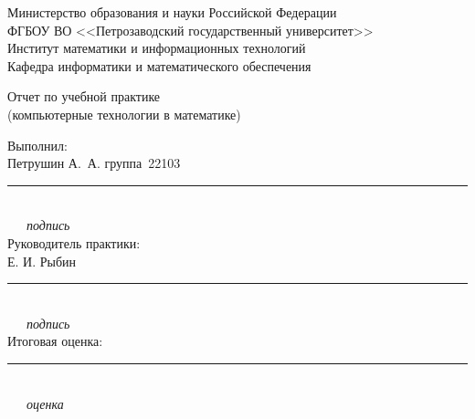 \documentclass[a4paper,12pt]{article}
\renewcommand{\baselinestretch}{1}
\begin{document}
\thispagestyle{empty}
\begin{center}

\renewcommand{\baselinestretch}{1}
{\large
{\sc Министерство образования и науки Российской Федерации\\
ФГБОУ ВО <<Петрозаводский государственный университет>>\\
Институт математики и информационных технологий\\
Кафедра информатики и математического обеспечения
}
}

\end{center}

\vfill

\begin{center}
{\normalsize Отчет по учебной практике\\(компьютерные технологии в математике) } \\

\end{center}
\bigskip

\begin{flushright}

  \parbox{8cm} {

    \renewcommand{\baselinestretch}{1}

    \normalsize

    Выполнил:\\Петрушин А.~А. группа\ 22103 \\
    \rule{55mm}{.3pt}\\
\mbox{\ \ \ \qqu}{\it подпись}\\

Руководитель практики:\\
Е. И. Рыбин\\
\rule{55mm}{.3pt}\\
\mbox{\ \ \ \qqu}{\it подпись}\\

Итоговая оценка:\\
\rule{55mm}{.3pt}\\
\mbox{\ \ \ \qqu}{\it оценка}\hfill\\

}
 
\end{flushright}
\end{document}
